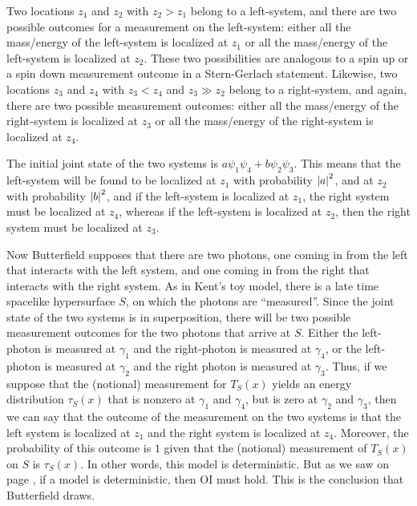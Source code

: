 Two locations $z_1$ and $z_2$ with $z_2>z_1$ belong to a left-system, and there are two possible outcomes for a measurement on the left-system: either all the mass/energy of the left-system is localized at $z_1$ or all the mass/energy of the left-system  is localized at $z_2$. These two possibilities are analogous to a spin up or a spin down measurement outcome in a Stern-Gerlach statement. Likewise, two locations $z_3$ and $z_4$ with $z_3<z_4$ and $z_3\gg z_2$ belong to a right-system, and again, there are two possible measurement outcomes: either all the mass/energy of the right-system is localized at $z_3$ or all the mass/energy of the right-system  is localized at $z_4$. 

The initial joint state of the two systems is 
$a \psi_1\psi_4 +b \psi_2\psi_3.$
This means that the left-system will be found to be localized at $z_1$ with probability $\abs{a}^2$, and at $z_2$ with probability $\abs{b}^2$, and if the left-system is localized at $z_1$, the  right system must be localized at $z_4$, whereas if the left-system is localized at $z_2$, then the right system must be localized at $z_3$.  

Now Butterfield supposes that there are two photons, one coming in from the left that interacts with the left system, and one coming in from the right that interacts with the right system. As in Kent's toy model, there is a late time spacelike hypersurface $S$, on which the photons are ``measured''. Since the joint state of the two systems  is in superposition, there will be two possible measurement outcomes for the two photons that arrive at $S$. Either the left-photon is measured at $\gamma_1$ and the right-photon is measured at $\gamma_4$, or the left-photon is measured at $\gamma_2$ and the right photon is measured at $\gamma_3$. Thus, if we suppose that the (notional) measurement for $T_S(x)$ yields an energy distribution $\tau_S(x)$ that is nonzero at $\gamma_1$ and $\gamma_4$, but is zero at $\gamma_2$ and $\gamma_3$, then we can say that the outcome of the measurement on the two systems is that the left system is localized at $z_1$ and the right system is localized at $z_4$. Moreover, the probability of this outcome is $1$ given that the (notional) measurement of $T_S(x)$ on $S$ is $\tau_S(x)$. In other words, this model is deterministic. But as we saw on page \pageref{OIdet}, if a model is deterministic, then OI must hold. This is the conclusion that Butterfield draws. 

